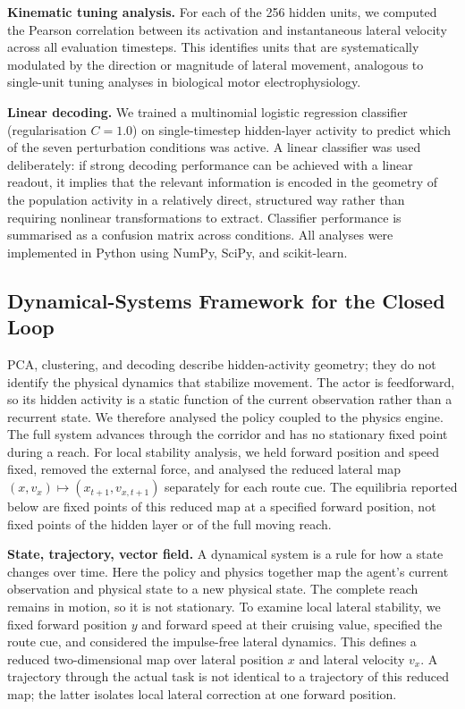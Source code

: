 \documentclass{article}
\begin{document}
\textbf{Kinematic tuning analysis.}
For each of the 256 hidden units, we computed the Pearson correlation
between its activation and instantaneous lateral velocity across all
evaluation timesteps.
This identifies units that are systematically modulated by the direction
or magnitude of lateral movement, analogous to single-unit tuning analyses
in biological motor electrophysiology.

\textbf{Linear decoding.}
We trained a multinomial logistic regression classifier (regularisation
$C = 1.0$) on single-timestep hidden-layer activity to predict which of
the seven perturbation conditions was active.
A linear classifier was used deliberately: if strong decoding performance
can be achieved with a linear readout, it implies that the relevant
information is encoded in the geometry of the population activity in a
relatively direct, structured way rather than requiring nonlinear
transformations to extract.
Classifier performance is summarised as a confusion matrix across
conditions.
All analyses were implemented in Python using NumPy, SciPy, and
scikit-learn.

\subsection{Dynamical-Systems Framework for the Closed Loop}
\label{sec:dynsys}

PCA, clustering, and decoding describe hidden-activity geometry; they do
not identify the physical dynamics that stabilize movement. The actor is
feedforward, so its hidden activity is a static function of the current
observation rather than a recurrent state. We therefore analysed the
policy coupled to the physics engine. The full system advances through the
corridor and has no stationary fixed point during a reach. For local
stability analysis, we held forward position and speed fixed, removed the
external force, and analysed the reduced lateral map
$(x,v_x)\mapsto(x_{t+1},v_{x,t+1})$ separately for each route cue. The
equilibria reported below are fixed points of this reduced map at a
specified forward position, not fixed points of the hidden layer or of the
full moving reach.

\textbf{State, trajectory, vector field.}
A dynamical system is a rule for how a state changes over time. Here the
policy and physics together map the agent's current observation and
physical state to a new physical state. The complete reach remains in
motion, so it is not stationary. To examine local lateral stability, we
fixed forward position $y$ and forward speed at their cruising value,
specified the route cue, and considered the impulse-free lateral dynamics.
This defines a reduced two-dimensional map over lateral position $x$ and
lateral velocity $v_x$. A trajectory through the actual task is not
identical to a trajectory of this reduced map; the latter isolates local
lateral correction at one forward position.
\end{document}
